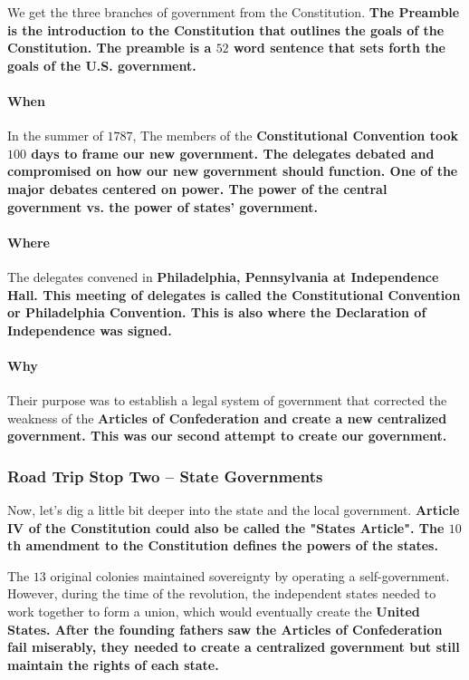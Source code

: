We get the three branches of government from the Constitution.
\bf{The Preamble} is the introduction to the Constitution that outlines the goals of the Constitution. The preamble is a $52$ word sentence that sets forth the goals of the U.S. government.

\paragraph{When} In the summer of $1787$, The members of the \bf{Constitutional Convention} took $100$ days to frame our new government. The delegates debated and compromised on how our new government should function. One of the major debates centered on power. The power of the central government vs. the power of states' government.

\paragraph{Where} The delegates convened in \bf{Philadelphia, Pennsylvania} at \bf{Independence Hall}. This meeting of delegates is called the \bf{Constitutional Convention} or \bf{Philadelphia Convention}. This is also where the \bf{Declaration of Independence} was signed.

\paragraph{Why} Their purpose was to establish a legal system of government that corrected the weakness of the \bf{Articles of Confederation} and create a new centralized government. This was our second attempt to create our government.

\subsubsection*{Road Trip Stop Two – State Governments}

Now, let's dig a little bit deeper into the state and the local government.
\bf{Article IV} of the Constitution could also be called the \bf{"States Article"}. The $10$th amendment to the Constitution defines the powers of the states.

The $13$ original colonies maintained sovereignty by operating a self-government. However, during the time of the revolution, the independent states needed to work together to form a union, which would eventually create the \bf{United States}. After the founding fathers saw the \bf{Articles of Confederation} fail miserably, they needed to create a centralized government but still maintain the rights of each state.


